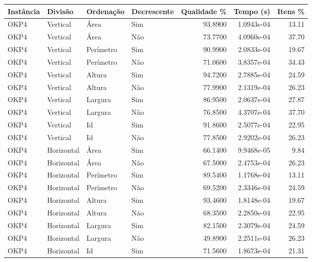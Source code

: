 \begin{tabular}{llllrrr}
\hline
Instância & Divisão     & Ordenação & Decrescente & Qualidade \% & Tempo (s)  & Itens \% \\
\hline
OKP4      & Vertical    & Área      & Sim         & 93.8900      & 1.0943e-04 & 13.11    \\
OKP4      & Vertical    & Área      & Não         & 73.7700      & 4.0960e-04 & 37.70    \\
OKP4      & Vertical    & Perímetro & Sim         & 90.9900      & 2.0833e-04 & 19.67    \\
OKP4      & Vertical    & Perímetro & Não         & 71.0600      & 3.8357e-04 & 34.43    \\
OKP4      & Vertical    & Altura    & Sim         & 94.7200      & 2.7885e-04 & 24.59    \\
OKP4      & Vertical    & Altura    & Não         & 77.9900      & 2.1319e-04 & 26.23    \\
OKP4      & Vertical    & Largura   & Sim         & 86.9500      & 2.0637e-04 & 27.87    \\
OKP4      & Vertical    & Largura   & Não         & 76.8500      & 4.3707e-04 & 37.70    \\
OKP4      & Vertical    & Id        & Sim         & 91.8600      & 2.5077e-04 & 22.95    \\
OKP4      & Vertical    & Id        & Não         & 77.8500      & 2.9202e-04 & 26.23    \\
OKP4      & Horizontal  & Área      & Sim         & 66.1400      & 9.9468e-05 & 9.84     \\
OKP4      & Horizontal  & Área      & Não         & 67.5000      & 2.4753e-04 & 26.23    \\
OKP4      & Horizontal  & Perímetro & Sim         & 89.5400      & 1.1768e-04 & 13.11    \\
OKP4      & Horizontal  & Perímetro & Não         & 69.5200      & 2.3346e-04 & 24.59    \\
OKP4      & Horizontal  & Altura    & Sim         & 93.4600      & 1.8148e-04 & 19.67    \\
OKP4      & Horizontal  & Altura    & Não         & 68.3500      & 2.2850e-04 & 22.95    \\
OKP4      & Horizontal  & Largura   & Sim         & 82.1500      & 2.3079e-04 & 24.59    \\
OKP4      & Horizontal  & Largura   & Não         & 49.8900      & 2.2511e-04 & 26.23    \\
OKP4      & Horizontal  & Id        & Sim         & 71.5600      & 1.8673e-04 & 21.31    \\

\end{tabular}
